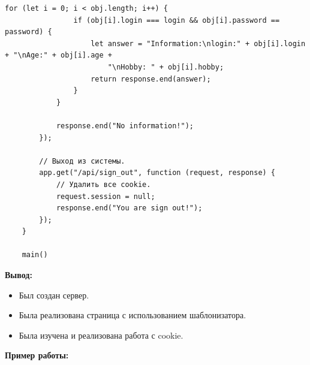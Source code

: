 \begin{lstlisting}[caption=Код программы. TASK\_2. Реализация задания 2]
			for (let i = 0; i < obj.length; i++) {
				if (obj[i].login === login && obj[i].password == password) {
					let answer = "Information:\nlogin:" + obj[i].login + "\nAge:" + obj[i].age +
						"\nHobby: " + obj[i].hobby;
					return response.end(answer);
				}
			}
	
			response.end("No information!");
		});
	
		// Выход из системы.
		app.get("/api/sign_out", function (request, response) {
			// Удалить все cookie.
			request.session = null;
			response.end("You are sign out!");
		});
	}
	
	main()	
\end{lstlisting}

\textbf{Вывод:}

\begin{itemize} 
	\item Был создан сервер.
	\item Была реализована страница с использованием шаблонизатора.
	\item Была изучена и реализована работа с cookie.
\end{itemize}


\textbf{Пример работы:}

\begin{figure}[ht!]
\end{figure}

\begin{figure}[ht!]
\end{figure}

